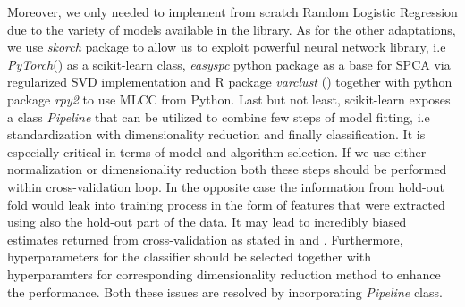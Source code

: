 \documentclass[shortabstract, english, mgr]{iithesis}
\begin{document}
Moreover, we only needed to implement from scratch Random Logistic Regression due to the variety of models available in the library. As for the other adaptations, we use \textit{skorch} package to allow us to exploit powerful neural network library, i.e \textit{PyTorch}(\cite{pytorch}) as a scikit-learn class, \textit{easyspc} python package as a base for SPCA via regularized SVD implementation and R package \textit{varclust} (\cite{varclust}) together with python package \textit{rpy2} to use MLCC from Python. Last but not least, scikit-learn exposes a class \textit{Pipeline} that can be utilized to combine few steps of model fitting, i.e standardization with dimensionality reduction and finally classification. It is especially critical in terms of model and algorithm selection. If we use either normalization or dimensionality reduction both these steps should be performed within cross-validation loop. In the opposite case the information from hold-out fold would leak into training process in the form of features that were extracted using also the hold-out part of the data. It may lead to incredibly biased estimates returned from cross-validation as stated in \cite[chapter 7.10.2]{ESL2} and \cite{dimRedInCV}. Furthermore, hyperparameters for the classifier should be selected together with hyperparamters for corresponding dimensionality reduction method to enhance the performance. Both these issues are resolved by incorporating \textit{Pipeline} class. 
\end{document}
